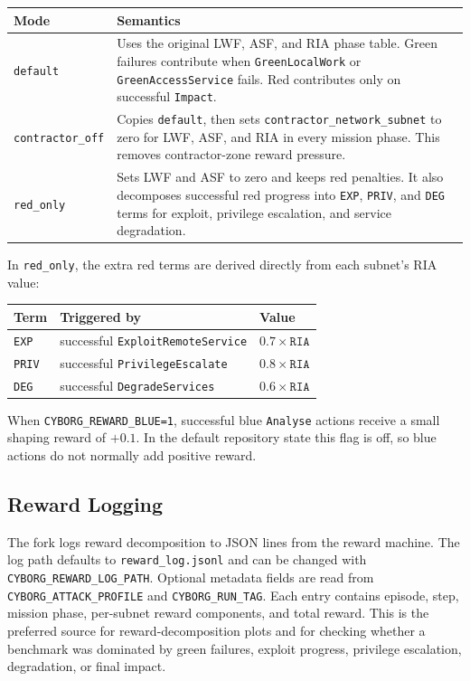 \begin{longtable}{p{}p{}}
\toprule
\textbf{Mode} & \textbf{Semantics} \\
\midrule
\texttt{default} & Uses the original LWF, ASF, and RIA phase table. Green failures contribute when \texttt{GreenLocalWork} or \texttt{GreenAccessService} fails. Red contributes only on successful \texttt{Impact}. \\
\texttt{contractor\_off} & Copies \texttt{default}, then sets \texttt{contractor\_network\_subnet} to zero for LWF, ASF, and RIA in every mission phase. This removes contractor-zone reward pressure. \\
\texttt{red\_only} & Sets LWF and ASF to zero and keeps red penalties. It also decomposes successful red progress into \texttt{EXP}, \texttt{PRIV}, and \texttt{DEG} terms for exploit, privilege escalation, and service degradation. \\
\bottomrule
\end{longtable}

In \texttt{red\_only}, the extra red terms are derived directly from each
subnet's RIA value:

\begin{center}
\begin{tabular}{lll}
\toprule
\textbf{Term} & \textbf{Triggered by} & \textbf{Value} \\
\midrule
\texttt{EXP} & successful \texttt{ExploitRemoteService} & $0.7 \times \texttt{RIA}$ \\
\texttt{PRIV} & successful \texttt{PrivilegeEscalate} & $0.8 \times \texttt{RIA}$ \\
\texttt{DEG} & successful \texttt{DegradeServices} & $0.6 \times \texttt{RIA}$ \\
\bottomrule
\end{tabular}
\end{center}

When \texttt{CYBORG\_REWARD\_BLUE=1}, successful blue \texttt{Analyse} actions
receive a small shaping reward of $+0.1$. In the default repository state this
flag is off, so blue actions do not normally add positive reward.

\subsection{Reward Logging}

The fork logs reward decomposition to JSON lines from the reward machine. The
log path defaults to \texttt{reward\_log.jsonl} and can be changed with
\texttt{CYBORG\_REWARD\_LOG\_PATH}. Optional metadata fields are read from
\texttt{CYBORG\_ATTACK\_PROFILE} and \texttt{CYBORG\_RUN\_TAG}. Each entry
contains episode, step, mission phase, per-subnet reward components, and total
reward. This is the preferred source for reward-decomposition plots and for
checking whether a benchmark was dominated by green failures, exploit progress,
privilege escalation, degradation, or final impact.

